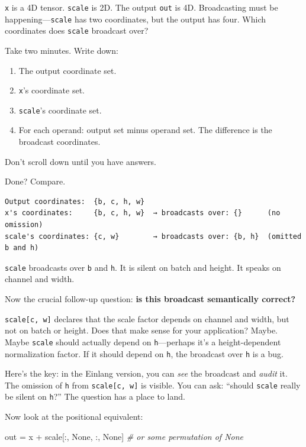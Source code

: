 \documentclass[11pt,titlepage]{article}
\newenvironment{Shaded}{}{}
\newcommand{\CommentTok}[1]{\textcolor[rgb]{0.38,0.63,0.69}{\textit{#1}}}
\newcommand{\NormalTok}[1]{#1}
\newcommand{\OperatorTok}[1]{\textcolor[rgb]{0.40,0.40,0.40}{#1}}
\newcommand{\VariableTok}[1]{\textcolor[rgb]{0.10,0.09,0.49}{#1}}
\providecommand{\tightlist}{%
  \setlength{\itemsep}{0pt}\setlength{\parskip}{0pt}}
\begin{document}
\texttt{x} is a 4D tensor. \texttt{scale} is 2D. The output \texttt{out}
is 4D. Broadcasting must be happening---\texttt{scale} has two
coordinates, but the output has four. Which coordinates does
\texttt{scale} broadcast over?

Take two minutes. Write down:

\begin{enumerate}
\def\labelenumi{\arabic{enumi}.}
\tightlist
\item
  The output coordinate set.
\item
  \texttt{x}'s coordinate set.
\item
  \texttt{scale}'s coordinate set.
\item
  For each operand: output set minus operand set. The difference is the
  broadcast coordinates.
\end{enumerate}

Don't scroll down until you have answers.

\vspace{2em}

Done? Compare.

\begin{verbatim}
Output coordinates:  {b, c, h, w}
x's coordinates:     {b, c, h, w}  → broadcasts over: {}      (no omission)
scale's coordinates: {c, w}        → broadcasts over: {b, h}  (omitted b and h)
\end{verbatim}

\texttt{scale} broadcasts over \texttt{b} and \texttt{h}. It is silent
on batch and height. It speaks on channel and width.

Now the crucial follow-up question: \textbf{is this broadcast
semantically correct?}

\texttt{scale{[}c,\ w{]}} declares that the scale factor depends on
channel and width, but not on batch or height. Does that make sense for
your application? Maybe. Maybe \texttt{scale} should actually depend on
\texttt{h}---perhaps it's a height-dependent normalization factor. If it
should depend on \texttt{h}, the broadcast over \texttt{h} is a bug.

Here's the key: in the Einlang version, you can \emph{see} the broadcast
and \emph{audit} it. The omission of \texttt{h} from
\texttt{scale{[}c,\ w{]}} is visible. You can ask: ``should
\texttt{scale} really be silent on \texttt{h}?'' The question has a
place to land.

Now look at the positional equivalent:

\begin{Shaded}
\begin{Highlighting}[]
\NormalTok{out }\OperatorTok{=}\NormalTok{ x }\OperatorTok{+}\NormalTok{ scale[:, }\VariableTok{None}\NormalTok{, :, }\VariableTok{None}\NormalTok{]  }\CommentTok{# or some permutation of None}
\end{Highlighting}
\end{Shaded}
\end{document}
